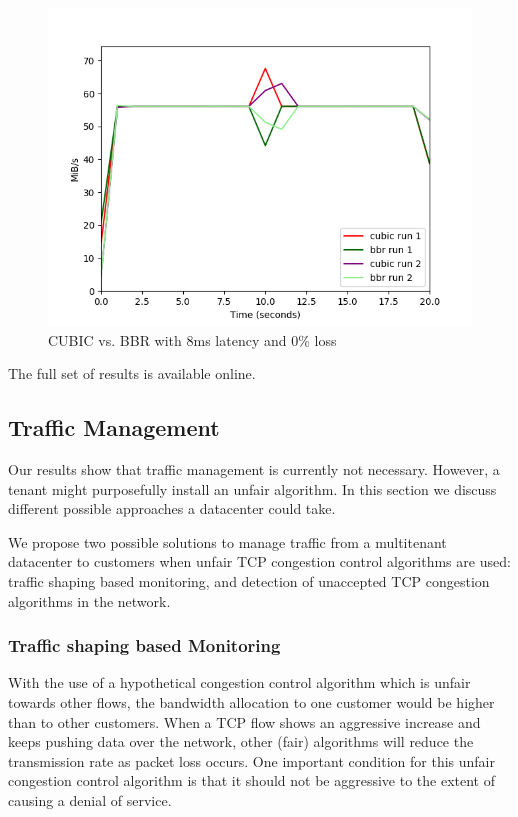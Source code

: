 \documentclass{article}
\begin{document}
\begin{figure}[H]
	\centering
		\includegraphics[scale=0.6]{figs/cubic_vs_bbr_8_0.png}
		\caption{CUBIC vs. BBR with 8ms latency and 0\% loss}
	\label{fig:bbr-cubic-0}
\end{figure}

The full set of results is available online\cite{git-lsproj}.



\subsection{Traffic Management}

Our results show that traffic management is currently not necessary. However, a
tenant might purposefully install an unfair algorithm. In this section we
discuss different possible approaches a datacenter could take.

We propose two possible solutions to manage traffic from a multitenant
datacenter to customers when unfair TCP congestion control algorithms are used:
traffic shaping based monitoring, and detection of unaccepted TCP congestion
algorithms in the network. 

\subsubsection{Traffic shaping based Monitoring}

With the use of a hypothetical congestion control algorithm which is unfair towards other flows, the bandwidth allocation to one customer would be higher than to other customers. When a TCP flow shows an aggressive increase and keeps pushing data over the network, other (fair) algorithms will reduce the transmission rate as packet loss occurs. One important condition for this unfair congestion control algorithm is that it should not be aggressive to the extent of causing a denial of service.
\end{document}
